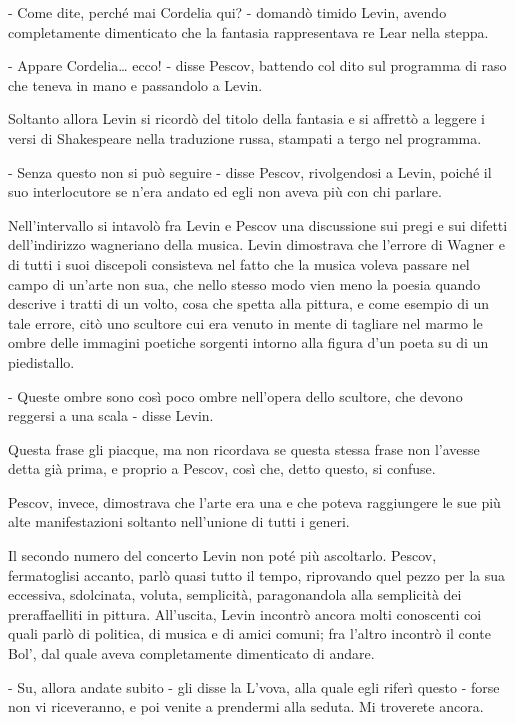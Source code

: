 - Come dite, perché mai Cordelia qui? - domandò timido Levin, avendo completamente dimenticato che la fantasia rappresentava re Lear nella steppa. 

- Appare Cordelia\ldots{} ecco! - disse Pescov, battendo col dito sul programma di raso che teneva in mano e passandolo a Levin. 

Soltanto allora Levin si ricordò del titolo della fantasia e si affrettò a leggere i versi di Shakespeare nella traduzione russa, stampati a tergo nel programma. 

- Senza questo non si può seguire - disse Pescov, rivolgendosi a Levin, poiché il suo interlocutore se n'era andato ed egli non aveva più con chi parlare. 

Nell'intervallo si intavolò fra Levin e Pescov una discussione sui pregi e sui difetti dell'indirizzo wagneriano della musica. Levin dimostrava che l'errore di Wagner e di tutti i suoi discepoli consisteva nel fatto che la musica voleva passare nel campo di un'arte non sua, che nello stesso modo vien meno la poesia quando descrive i tratti di un volto, cosa che spetta alla pittura, e come esempio di un tale errore, citò uno scultore cui era venuto in mente di tagliare nel marmo le ombre delle immagini poetiche sorgenti intorno alla figura d'un poeta su di un piedistallo. 

- Queste ombre sono così poco ombre nell'opera dello scultore, che devono reggersi a una scala - disse Levin. 

Questa frase gli piacque, ma non ricordava se questa stessa frase non l'avesse detta già prima, e proprio a Pescov, così che, detto questo, si confuse. 

Pescov, invece, dimostrava che l'arte era una e che poteva raggiungere le sue più alte manifestazioni soltanto nell'unione di tutti i generi. 

Il secondo numero del concerto Levin non poté più ascoltarlo. Pescov, fermatoglisi accanto, parlò quasi tutto il tempo, riprovando quel pezzo per la sua eccessiva, sdolcinata, voluta, semplicità, paragonandola alla semplicità dei preraffaelliti in pittura. All'uscita, Levin incontrò ancora molti conoscenti coi quali parlò di politica, di musica e di amici comuni; fra l'altro incontrò il conte Bol', dal quale aveva completamente dimenticato di andare. 

- Su, allora andate subito - gli disse la L'vova, alla quale egli riferì questo - forse non vi riceveranno, e poi venite a prendermi alla seduta. Mi troverete ancora. 

